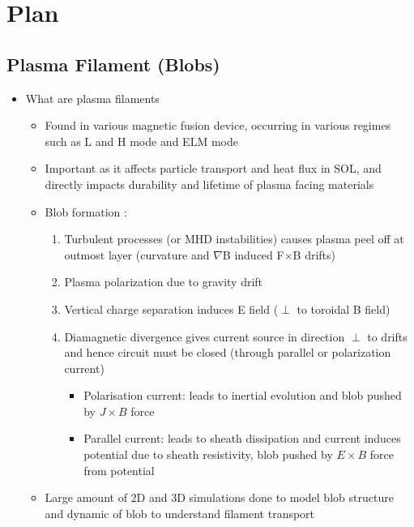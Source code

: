 \documentclass{article}
\begin{document}
\section*{Plan}
\subsection*{Plasma Filament (Blobs)}
\begin{itemize}
    \item What are plasma filaments
    \begin{itemize}
        \item Found in various magnetic fusion device, occurring in various regimes such as L and H mode \cite{boedo_transport_2003} and ELM mode \cite{ben_ayed_inter-elm_2009}
        \item Important as it affects particle transport and heat flux in SOL, and directly impacts durability and lifetime of plasma facing materials \cite{carralero_experimental_2015, krasheninnikov_recent_2008}
        \item Blob formation \cite{krasheninnikov_recent_2008}:
        \begin{enumerate}
            \item Turbulent processes (or MHD instabilities) causes plasma peel off at outmost layer (curvature and $\nabla$B induced F$\times$B drifts)
            \item Plasma polarization due to gravity drift
            \item Vertical charge separation induces E field ($\perp$ to toroidal B field)
            \item Diamagnetic divergence gives current source in direction $\perp$ to drifts and hence circuit must be closed (through parallel or polarization current) \cite{omotani_effects_2015}
            \begin{itemize}
                \item Polarisation current: leads to inertial evolution and blob pushed by $J\times B$ force
                \item Parallel current: leads to sheath dissipation and current induces potential due to sheath resistivity, blob pushed by $E\times B$ force from potential
            \end{itemize}
        \end{enumerate}
        \item Large amount of 2D and 3D simulations \cite{omotani_effects_2015, easy_three_2014, nespoli_3d_2019, garcia_mechanism_2005, shanahan_fluid_2018} done to model blob structure and dynamic of blob to understand filament transport  

\end{itemize}
\end{itemize}
\end{document}
